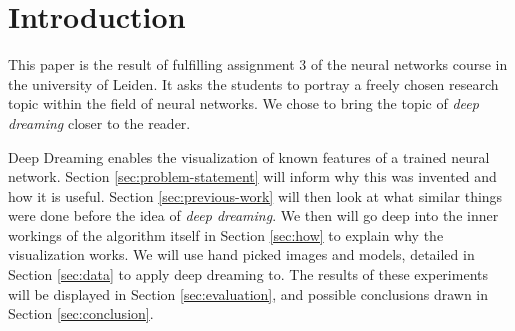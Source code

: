 \section{Introduction}
This paper is the result of fulfilling assignment 3 of the neural networks course in the university of Leiden.
It asks the students to portray a freely chosen research topic within the field of neural networks.
We chose to bring the topic of \textit{deep dreaming} closer to the reader.

Deep Dreaming enables the visualization of known features of a trained neural network.
Section \ref{sec:problem-statement} will inform why this was invented and how it is useful.
Section \ref{sec:previous-work} will then look at what similar things were done before the idea of \textit{deep dreaming}.
We then will go deep into the inner workings of the algorithm itself in Section \ref{sec:how} to explain why the visualization works.
We will use hand picked images and models, detailed in Section \ref{sec:data} to apply deep dreaming to. The results of these experiments will be displayed in Section \ref{sec:evaluation}, and possible conclusions drawn in Section \ref{sec:conclusion}.





